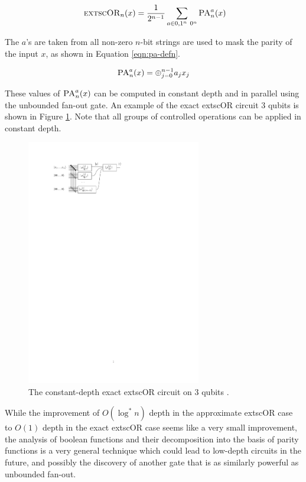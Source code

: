 \begin{equation}
\textsc{	extsc{OR}}_n(x) = \frac{1}{2^{n-1}} \sum_{a\in {0,1}^n\ {0^n}} \textsc{PA}_n^a(x)
\label{eqn:pa-decomp}
\end{equation}

The $a$'s are taken from all non-zero $n$-bit strings are used to mask
the parity of the input $x$, as shown in Equation \ref{eqn:pa-defn}.

\begin{equation}
\textsc{PA}_n^a(x) = \oplus_{j=0}^{n-1} a_j x_j
\label{eqn:pa-defn}
\end{equation}

These values of $\textsc{PA}_n^a(x)$ can be computed in constant depth and
in parallel using
the unbounded fan-out gate. An example of the exact 	extsc{OR} circuit 3 qubits is
shown in Figure
\ref{fig:or3}. Note that all groups of controlled operations can be applied
in constant depth.

\begin{center}
\begin{figure}
\includegraphics[width=3in]{figures/or-approx.pdf}
\caption{The constant-depth exact 	extsc{OR} circuit on 3 qubits \cite{Takahashi2011}.}
\label{fig:or3}
\end{figure}
\end{center}

While the improvement of $O(\log^*{n})$ depth in the approximate 	extsc{OR} case to
$O(1)$ depth in the exact 	extsc{OR} case seems like a very small improvement,
the analysis of boolean functions and their decomposition into the
basis of parity functions is a very general technique which could lead to
low-depth circuits in the future, and possibly the discovery of another gate
that is as similarly powerful as unbounded fan-out.